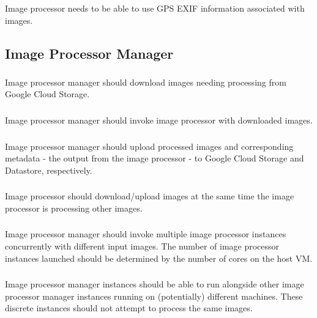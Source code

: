 \documentclass[10pt, onecolumn, draftclsnofoot, letterpaper, compsoc]{IEEEtran}
\begin{document}
Image processor needs to be able to use GPS EXIF information associated with
images.\\

\subsection{Image Processor Manager}

    \subsubsection{}
    Image processor manager should download images needing processing
    from Google Cloud Storage. \\

    \subsubsection{}
    Image processor manager should invoke image processor with downloaded images. \\

    \subsubsection{}
    Image processor manager should upload processed images and corresponding metadata
    - the output from the image processor - to Google Cloud Storage and Datastore, respectively. \\

    \subsubsection{}
    Image processor should download/upload images at the same time the image processor
    is processing other images. \\

    \subsubsection{}
    Image processor manager should invoke multiple image processor instances concurrently
    with different input images. The number of image processor instances launched should be
    determined by the number of cores on the host VM. \\

    \subsubsection{}
    Image processor manager instances should be able to run alongside other image processor
    manager instances running on (potentially) different machines. These discrete instances should
    not attempt to process the same images. \\
\end{document}
